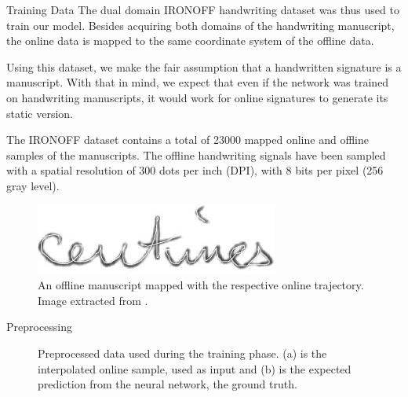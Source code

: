 \documentclass{beamer}
\begin{document}
\begin{frame}{Training Data}
The dual domain IRONOFF \parencite{viard1999ireste} handwriting dataset was thus used to train our model. Besides acquiring both domains of the handwriting manuscript, the online data is mapped to the same coordinate system of the offline data.

Using this dataset, we make the fair assumption that a handwritten signature is a manuscript. With that in mind, we expect that even if the network was trained on handwriting manuscripts, it would work for online signatures to generate its static version.

The IRONOFF dataset contains a total of 23000 mapped online and offline samples of the manuscripts. The offline handwriting signals have been sampled with a spatial resolution of 300 dots per inch (DPI), with 8 bits per pixel (256 gray level).

\begin{figure}[!htb]
\centering
\includegraphics{ironoff-mapped}
\caption{An offline manuscript mapped with the respective online trajectory. Image extracted from \cite{viard1999ireste}.}
\label{fig:ironoff-mapped}
\end{figure}
\end{frame}


\begin{frame}{Preprocessing}
\begin{figure}[!htpb]
\centering
\hspace*{0.5in} %
\caption{Preprocessed data used during the training phase. (a) is the interpolated online sample, used as input and (b) is the expected prediction from the neural network, the ground truth. } \label{fig_ironoff}
\end{figure}
\end{frame}
\end{document}

